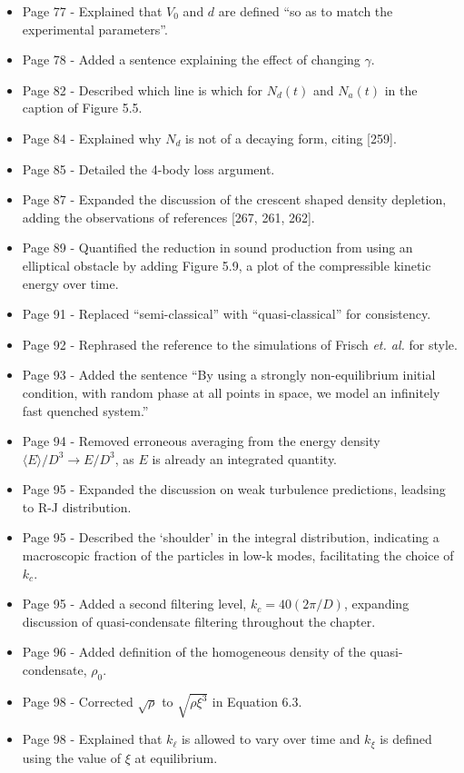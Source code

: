 \documentclass{article}
\begin{document}
\begin{itemize}
\item Page 77 - Explained that $V_0$ and $d$ are defined ``so as to match the experimental parameters''.
\item Page 78 - Added a sentence explaining the effect of changing $\gamma$.
\item Page 82 - Described which line is which for $N_d(t)$ and $N_a(t)$ in the caption of Figure 5.5.
\item Page 84 - Explained why $N_d$ is not of a decaying form, citing [259].
\item Page 85 - Detailed the 4-body loss argument.
\item Page 87 - Expanded the discussion of the crescent shaped density depletion, adding the observations of references [267, 261, 262].
\item Page 89 - Quantified the reduction in sound production from using an elliptical obstacle by adding Figure 5.9, a plot of the compressible kinetic energy over time.
\item Page 91 - Replaced ``semi-classical'' with ``quasi-classical'' for consistency.
\item Page 92 - Rephrased the reference to the simulations of Frisch {\it et. al.} for style.
\item Page 93 - Added the sentence ``By using a strongly non-equilibrium initial condition, with random phase at all points in space, we model an infinitely fast quenched system.''
\item Page 94 - Removed erroneous averaging from the energy density $\langle E \rangle/D^3 \rightarrow E/D^3$, as $E$ is already an integrated quantity.
\item Page 95 - Expanded the discussion on weak turbulence predictions, leadsing to R-J distribution.
\item Page 95 - Described the `shoulder' in the integral distribution, indicating a macroscopic fraction of the particles in low-k modes, facilitating the choice of $k_c$.
\item Page 95 - Added a second filtering level, $k_c=40 (2\pi/D)$, expanding discussion of quasi-condensate filtering throughout the chapter.
\item Page 96 - Added definition of the homogeneous density of the quasi-condensate, $\rho_0$.
\item Page 98 - Corrected $\sqrt{\rho}$ to $\sqrt{\rho\xi^3}$ in Equation 6.3.
\item Page 98 - Explained that $k_\ell$ is allowed to vary over time and $k_\xi$ is defined using the value of $\xi$ at equilibrium.

\end{itemize}
\end{document}
